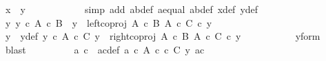 \begin{isabellebody}
\ {\isachardoublequoteopen}x\ {\isacharequal}{\kern0pt}\ y{\isachardoublequoteclose}\isanewline
\ \ \ \ \ \ \ \ \ \ \isamarkupfalse%
\ {\isacharparenleft}{\kern0pt}simp\ add{\isacharcolon}{\kern0pt}\ a{\isacharprime}{\kern0pt}b{\isacharprime}{\kern0pt}{\isacharunderscore}{\kern0pt}def\ a{\isacharunderscore}{\kern0pt}equal\ ab{\isacharunderscore}{\kern0pt}def\ x{\isacharprime}{\kern0pt}{\isacharunderscore}{\kern0pt}def\ y{\isacharprime}{\kern0pt}{\isacharunderscore}{\kern0pt}def{\isacharparenright}{\kern0pt}\isanewline
\ \ \ \ \isamarkupfalse%
\ \isanewline
\ \ \ \ \ \ \isamarkupfalse%
\ {\isachardoublequoteopen}{\isasymnexists}y{\isacharprime}{\kern0pt}{\isachardot}{\kern0pt}\ y{\isacharprime}{\kern0pt}\ {\isasymin}\isactrlsub c\ A\ {\isasymtimes}\isactrlsub c\ B\ {\isasymand}\ y\ {\isacharequal}{\kern0pt}\ left{\isacharunderscore}{\kern0pt}coproj\ {\isacharparenleft}{\kern0pt}A\ {\isasymtimes}\isactrlsub c\ B{\isacharparenright}{\kern0pt}\ {\isacharparenleft}{\kern0pt}A\ {\isasymtimes}\isactrlsub c\ C{\isacharparenright}{\kern0pt}\ {\isasymcirc}\isactrlsub c\ y{\isacharprime}{\kern0pt}{\isachardoublequoteclose}\isanewline
\ \ \ \ \ \ \isamarkupfalse%
\ \isamarkupfalse%
\ y{\isacharprime}{\kern0pt}\ \ y{\isacharprime}{\kern0pt}{\isacharunderscore}{\kern0pt}def{\isacharcolon}{\kern0pt}\ {\isachardoublequoteopen}y{\isacharprime}{\kern0pt}\ {\isasymin}\isactrlsub c\ A\ {\isasymtimes}\isactrlsub c\ C{\isachardoublequoteclose}\ {\isachardoublequoteopen}y\ {\isacharequal}{\kern0pt}\ right{\isacharunderscore}{\kern0pt}coproj\ {\isacharparenleft}{\kern0pt}A\ {\isasymtimes}\isactrlsub c\ B{\isacharparenright}{\kern0pt}\ {\isacharparenleft}{\kern0pt}A\ {\isasymtimes}\isactrlsub c\ C{\isacharparenright}{\kern0pt}\ {\isasymcirc}\isactrlsub c\ y{\isacharprime}{\kern0pt}{\isachardoublequoteclose}\isanewline
\ \ \ \ \ \ \ \ \isamarkupfalse%
\ \ y{\isacharunderscore}{\kern0pt}form\ \isamarkupfalse%
\ blast\isanewline
\ \ \ \ \ \ \isamarkupfalse%
\ \isamarkupfalse%
\ a{\isacharprime}{\kern0pt}\ c{\isacharprime}{\kern0pt}\ \ a{\isacharprime}{\kern0pt}c{\isacharprime}{\kern0pt}{\isacharunderscore}{\kern0pt}def{\isacharcolon}{\kern0pt}\ {\isachardoublequoteopen}a{\isacharprime}{\kern0pt}\ {\isasymin}\isactrlsub c\ A{\isachardoublequoteclose}\ {\isachardoublequoteopen}c{\isacharprime}{\kern0pt}\ {\isasymin}\isactrlsub c\ C{\isachardoublequoteclose}\ {\isachardoublequoteopen}y{\isacharprime}{\kern0pt}\ {\isacharequal}{\kern0pt}{\isasymlangle}a{\isacharprime}{\kern0pt}{\isacharcomma}{\kern0pt}c{\isacharprime}{\kern0pt}{\isasymrangle}{\isachardoublequoteclose}\isanewline

\end{isabellebody}
